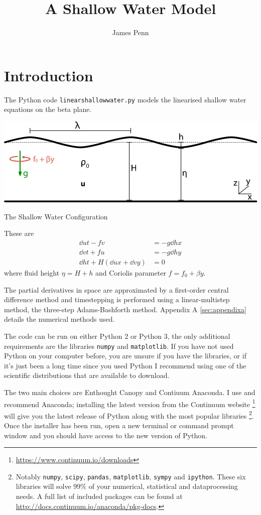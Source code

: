 \documentclass[a4paper, sfsidenotes, twoside]{tufte-handout}
\author{James Penn}
\title{A Shallow Water Model}
\begin{document}
  \section{Introduction}
  \label{sec:Introduction}
  The Python code \texttt{linearshallowwater.py} models the linearised shallow
  water equations on the beta plane.
  \begin{marginfigure}[1in]
    \includegraphics{shallow_water}
    \caption{The Shallow Water Configuration}
    \label{fig:shallow}
  \end{marginfigure}
  These are
  \begin{align}
    \dd{u}{t} - fv &= - g \dd{h}{x} \\
    \dd{v}{t} + fu &= - g \dd{h}{y} \\
    \dd{h}{t} + H(\dd{u}{x} + \dd{v}{y}) &= 0
  \end{align}
  where fluid height $\eta = H + h$ and Coriolis parameter $f=f_0 + \beta y$.

  The partial derivatives in space are approximated by a first-order central
  difference method and timestepping is performed using a linear-multistep method,
  the three-step Adams-Bashforth method.
  Appendix A \ref{sec:appendixa} details the numerical methods used.

  The code can be run on either Python 2 or Python 3, the only additional requirements are the libraries \texttt{numpy} and \texttt{matplotlib}.
  If you have not used Python on your computer before, you are unsure if you have the libraries, or if it's just been a long time since you used Python I recommend using one of the scientific distributions that are available to download.

  The two main choices are Enthought Canopy and Contiuum Anaconda.
  I use and recommend Anaconda; installing the latest version from the Continuum website \footnote{\url{https://www.continuum.io/downloads}} will give you the latest release of Python along with the most popular libraries \footnote{Notably \texttt{numpy}, \texttt{scipy}, \texttt{pandas}, \texttt{matplotlib}, \texttt{sympy} and \texttt{ipython}.  These six libraries will solve 99\% of your numerical, statistical and dataprocessing needs.
  A full list of included packages can be found at \url{http://docs.continuum.io/anaconda/pkg-docs}.}.
  Once the installer has been run, open a new terminal or command prompt window and you should have access to the new version of Python.
\end{document}
